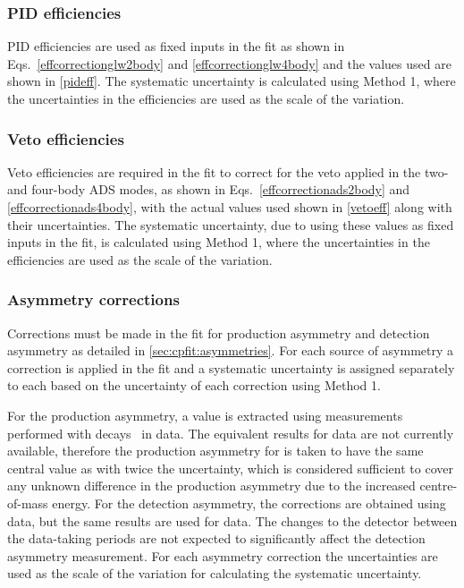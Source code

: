 \subsubsection{PID efficiencies}

PID efficiencies are used as fixed inputs in the \CP fit as shown in Eqs.~\ref{effcorrectionglw2body} and \ref{effcorrectionglw4body} and the values used are shown in \tab\ref{pideff}. The systematic uncertainty is calculated using Method 1, where the uncertainties in the efficiencies are used as the scale of the variation.

\subsubsection{Veto efficiencies}

Veto efficiencies are required in the \CP fit to correct for the veto applied in the two- and four-body ADS modes, as shown in Eqs.~\ref{effcorrectionads2body} and \ref{effcorrectionads4body}, with the actual values used shown in \tab\ref{vetoeff} along with their uncertainties. The systematic uncertainty, due to using these values as fixed inputs in the \CP fit, is calculated using Method 1, where the uncertainties in the efficiencies are used as the scale of the variation.

\subsubsection{Asymmetry corrections}

Corrections must be made in the \CP fit for production asymmetry and detection asymmetry as detailed in \sect\ref{sec:cpfit:asymmetries}. For each source of asymmetry a correction is applied in the \CP fit and a systematic uncertainty is assigned separately to each based on the uncertainty of each correction using Method 1. 

For the production asymmetry, a \runone value is extracted using measurements performed with \decay{\Bp}{\Dzb\pip} decays~\cite{LHCb-PAPER-2016-054} in data. The equivalent results for \runtwo data are not currently available, therefore the production asymmetry for \runtwo is taken to have the same central value as \runone with twice the uncertainty, which is considered sufficient to cover any unknown difference in the production asymmetry due to the increased centre-of-mass energy. For the detection asymmetry, the corrections are obtained using \runone data, but the same results are used for \runtwo data. The changes to the detector between the data-taking periods are not expected to significantly affect the detection asymmetry measurement.  For each asymmetry correction the uncertainties are used as the scale of the variation for calculating the systematic uncertainty.

